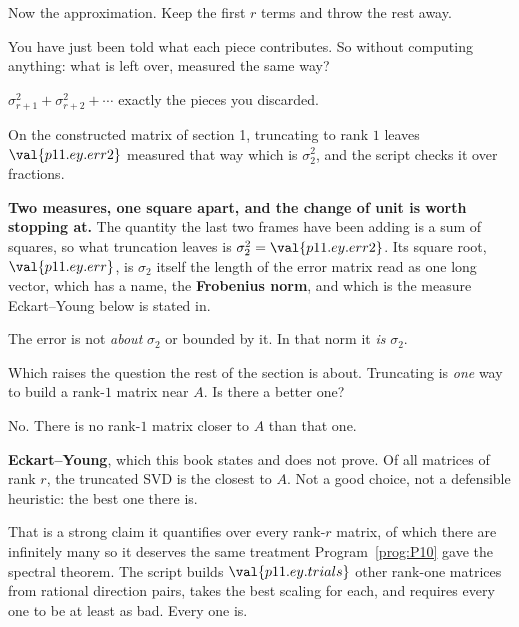 
\begin{fr}
Now the approximation. Keep the first $r$ terms and throw the rest away.

You have just been told what each piece contributes. So without computing
anything: what is left over, measured the same way?
\dotline
\nextframe
\end{fr}

\begin{fr}
\begin{ansblock}
$\sigma_{r+1}^{2} + \sigma_{r+2}^{2} + \cdots$ \dash{} exactly the pieces you
discarded.
\end{ansblock}

On the constructed matrix of section 1, truncating to rank $1$ leaves
$\val{p11.ey.err2}$ measured that way \dash{} which is $\sigma_2^{2}$, and the
script checks it over fractions.

\textbf{Two measures, one square apart, and the change of unit is worth
stopping at.} The quantity the last two frames have been adding is a sum of
squares, so what truncation leaves is $\sigma_2^{2} = \val{p11.ey.err2}$. Its
square root, $\val{p11.ey.err}$, is $\sigma_2$ itself \dash{} the length of the
error matrix read as one long vector, which has a name, the \textbf{Frobenius
norm}, and which is the measure Eckart--Young below is stated in.

The error is not \emph{about} $\sigma_2$ or bounded by it. In that norm it
\emph{is} $\sigma_2$.

Which raises the question the rest of the section is about. Truncating is
\emph{one} way to build a rank-$1$ matrix near $A$. Is there a better one?
\dotline
\nextframe
\end{fr}

\begin{fr}
\begin{ansblock}
No. There is no rank-$1$ matrix closer to $A$ than that one.
\end{ansblock}

\textbf{Eckart--Young}, which this book states and does not prove. Of all
matrices of rank $r$, the truncated SVD is the closest to $A$. Not a good
choice, not a defensible heuristic: the best one there is.

That is a strong claim \dash{} it quantifies over every rank-$r$ matrix, of
which there are infinitely many \dash{} so it deserves the same treatment
Program~\ref{prog:P10} gave the spectral theorem. The script builds
$\val{p11.ey.trials}$ other rank-one matrices from rational direction pairs,
takes the best scaling for each, and requires every one to be at least as bad.
Every one is.
\end{fr}

